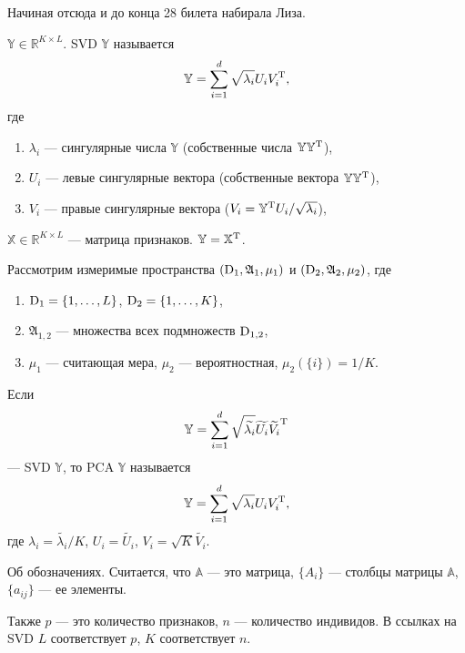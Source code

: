 
{\color{blue} Начиная отсюда и до конца 28 билета набирала Лиза.}
\begin{notation}
$\mathbb{Y} \in \mathbb{R}^{K\times L}$. 
SVD $\mathbb{Y}$ называется
\begin{gather*}
\mathbb{Y} = \sum_{i = 1}^{d} \sqrt{\lambda_i}U_iV_i^{\rm T},
\end{gather*}
где 
\begin{enumerate}
\item
$\lambda_i$ --- сингулярные числа $\mathbb{Y}$ (собственные числа $\mathbb{Y}\mathbb{Y}^{\rm T}$),
\item
$U_i$ --- левые сингулярные вектора (собственные вектора $\mathbb{Y}\mathbb{Y}^{\rm T}$),
\item
$V_i$ --- правые сингулярные вектора ($V_i = \mathbb{Y}^{\rm T}U_i/\sqrt{\lambda_i}$),
\end{enumerate}
\end{notation}

\begin{notation}
$\mathbb{X} \in \mathbb{R}^{K\times L}$ --- матрица признаков.
$\mathbb{Y} = \mathbb{X}^{\rm T}$.

Рассмотрим измеримые пространства $({\rm D}_1, \mathfrak{A}_1, \mu_1)$ и $({\rm D}_2, \mathfrak{A}_2, \mu_2)$, где
\begin{enumerate}
\item
${\rm D}_1 = \{1,\ldots, L\}$, ${\rm D}_2 = \{1,\ldots, K\}$, 
\item
$\mathfrak{A}_{1, 2}$ --- множества всех подмножеств ${\rm D}_{1,2}$, 
\item
$\mu_1$ --- считающая мера, $\mu_2$ --- вероятностная, $\mu_2(\{i\}) = 1/K$.
\end{enumerate}
Если 
\begin{gather*}
\mathbb{Y} = \sum_{i = 1}^{d} \sqrt{\tilde{\lambda_i}}\tilde{U_i}\tilde{V_i}^{\rm T}
\end{gather*}
--- SVD $\mathbb{Y}$, то 
PCA $\mathbb{Y}$ называется
\begin{gather*}
\mathbb{Y} = \sum_{i = 1}^{d} \sqrt{\lambda_i}U_iV_i^{\rm T},
\end{gather*}
где
$\lambda_i = \tilde{\lambda_i}/K$,
$U_i = \tilde{U_i}$,
$V_i = \sqrt{K}\tilde{V_i}$.
\end{notation}

\begin{note}
Об обозначениях. Считается, что
$\mathbb{A}$ --- это матрица, $\{A_i\}$ --- столбцы матрицы $\mathbb{A}$, $\{a_{ij}\}$ --- ее элементы.

Также $p$ --- это количество признаков, $n$ --- количество индивидов.
В ссылках на SVD $L$ соответствует $p$, $K$ соответствует $n$.  
\end{note}

